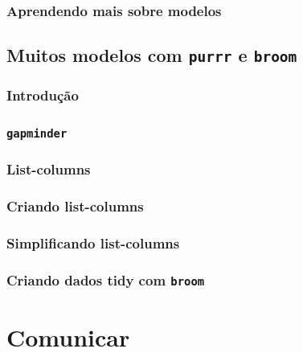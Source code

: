 \documentclass[
]{latex/krantz}
\theoremstyle{definition}
\theoremstyle{definition}
\theoremstyle{definition}
\theoremstyle{definition}
\theoremstyle{remark}
\begin{document}
\hypertarget{aprendendo-mais-sobre-modelos}{%
\section{Aprendendo mais sobre modelos}\label{aprendendo-mais-sobre-modelos}}

\hypertarget{muitos-modelos-com-purrr-e-broom}{%
\chapter{\texorpdfstring{Muitos modelos com \texttt{purrr} e \texttt{broom}}{Muitos modelos com purrr e broom}}\label{muitos-modelos-com-purrr-e-broom}}

\hypertarget{introduuxe7uxe3o-16}{%
\section{Introdução}\label{introduuxe7uxe3o-16}}

\hypertarget{gapminder}{%
\section{\texorpdfstring{\texttt{gapminder}}{gapminder}}\label{gapminder}}

\hypertarget{list-columns}{%
\section{List-columns}\label{list-columns}}

\hypertarget{criando-list-columns}{%
\section{Criando list-columns}\label{criando-list-columns}}

\hypertarget{simplificando-list-columns}{%
\section{Simplificando list-columns}\label{simplificando-list-columns}}

\hypertarget{criando-dados-tidy-com-broom}{%
\section{\texorpdfstring{Criando dados tidy com \texttt{broom}}{Criando dados tidy com broom}}\label{criando-dados-tidy-com-broom}}

\hypertarget{part-comunicar}{%
\part{Comunicar}\label{part-comunicar}}
\end{document}
